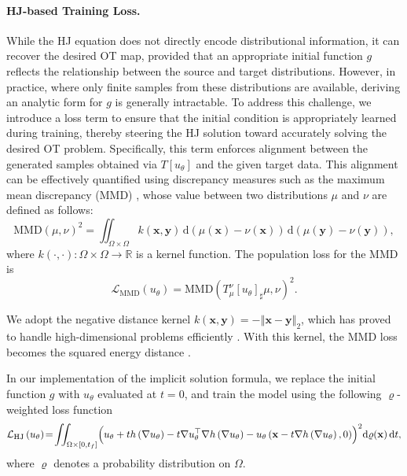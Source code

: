 \documentclass{article} %
\theoremstyle{plain}
\theoremstyle{definition}
\theoremstyle{remark}
\newcommand{\bx}{\mathbf{x}}
\newcommand{\by}{\mathbf{y}}
\newcommand{\LMMD}{\mathcal{L}_{\text{MMD}}}
\newcommand{\LHJ}{\mathcal{L}_{\text{HJ}}}
\newcommand{\rd}{\mathrm{d}}
\newcommand{\tp}{^{\top}}
\begin{document}
\paragraph{HJ-based Training Loss.}
While the HJ equation does not directly encode distributional information, it can recover the desired OT map, provided that an appropriate initial function $g$ reflects the relationship between the source and target distributions. However, in practice, where only finite samples from these distributions are available, deriving an analytic form for $g$ is generally intractable. To address this challenge, we introduce a loss term to ensure that the initial condition is appropriately learned during training, thereby steering the HJ solution toward accurately solving the desired OT problem.
Specifically, this term enforces alignment between the generated samples obtained via $T\left[u_\theta\right]$ and the given target data. This alignment can be effectively quantified using discrepancy measures such as the maximum mean discrepancy (MMD) \citep{smola2006maximum}, whose value between two distributions $\mu$ and $\nu$ are defined as follows:
\begin{equation} 
  \mathrm{MMD}(\mu, \nu)^2 = \iint_{\Omega\times \Omega} k(\bx, \by)\, \rd(\mu(\bx) - \nu(\bx)) \, \rd(\mu(\by) - \nu(\by)),  \label{def: mmd}
\end{equation}
where $k(\cdot, \cdot):\Omega \times \Omega \rightarrow \mathbb{R}$ is a kernel function. The population loss for the MMD is
\begin{equation}\label{eq:loss_mmd}
\LMMD(u_\theta) = \mathrm{MMD}(T_\mu^\nu[ u_\theta]_\sharp\mu, \nu)^2.
\end{equation}

We adopt the negative distance kernel $k\left(\bx,\by\right)=-\left\Vert\bx-\by \right\Vert_2$, which has proved to handle high-dimensional problems efficiently \citep{hertrich2023generative}. With this kernel, the MMD loss becomes the squared energy distance \citep{rizzo2016energy}.

In our implementation of the implicit solution formula, we replace the initial function $g$ with $u_\theta$ evaluated at $t=0$, and train the model using the following $\varrho$-weighted loss function %
\begin{equation}\label{eq:implicit_loss}
\LHJ\left(u_\theta\right)\!=\!\iint_{\Omega\times [0, t_f]} \Bigl(u_\theta + th\left(\nabla u_\theta\right) - t\nabla u_\theta\tp\nabla h\left(\nabla u_\theta\right) - u_\theta\left(\bx-t\nabla h\left(\nabla u_\theta\right),0\right)\Bigr)^2 \rd\varrho(\bx) \,\rd t,
\end{equation}
\vspace{-0.1cm}
where $\varrho$ denotes a probability distribution on $\Omega$. 
\end{document}
